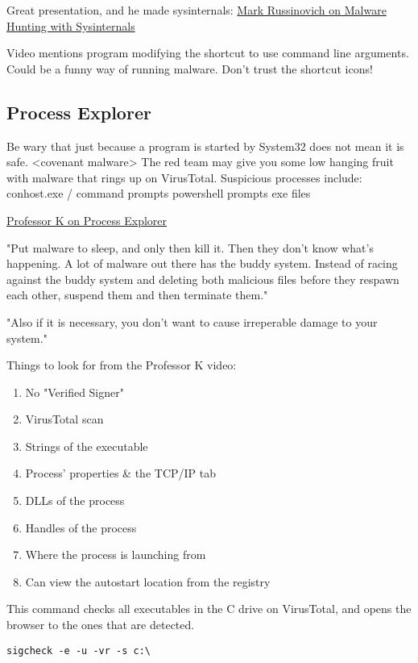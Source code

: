 \documentclass{article}
\begin{document}
Great presentation, and he made sysinternals: 
\href{https://youtu.be/vW8eAqZyWeo}{Mark Russinovich on Malware Hunting with Sysinternals}

Video mentions program modifying the shortcut to use command line arguments. 
Could be a funny way of running malware. Don't trust the shortcut icons!

\subsection{Process Explorer}
Be wary that just because a program is started by System32 does not mean it is safe. <covenant malware>
The red team may give you some low hanging fruit with malware that rings up on VirusTotal.
Suspicious processes include:
conhost.exe / command prompts
powershell prompts
exe files

\href{https://youtu.be/y2bNLCWHFNs}{Professor K on Process Explorer}

"Put malware to sleep, and only then kill it. 
Then they don't know what's happening.
A lot of malware out there has
the buddy system. Instead of racing against the buddy system
and deleting both malicious files before they respawn each other,
suspend them and then terminate them."

"Also if it is necessary, you don't want to cause irreperable damage to your system."

Things to look for from the Professor K video:
\begin{enumerate}
        \item No "Verified Signer"
        \item VirusTotal scan
        \item Strings of the executable
        \item Process' properties \& the TCP/IP tab
        \item DLLs of the process
        \item Handles of the process
        \item Where the process is launching from
        \item Can view the autostart location from the registry
\end{enumerate}

This command checks all executables in the C drive on VirusTotal,
 and opens the browser to the ones that are detected.
\begin{lstlisting}[breaklines=true, columns=fullflexible]
        sigcheck -e -u -vr -s c:\       
\end{lstlisting}
\end{document}

